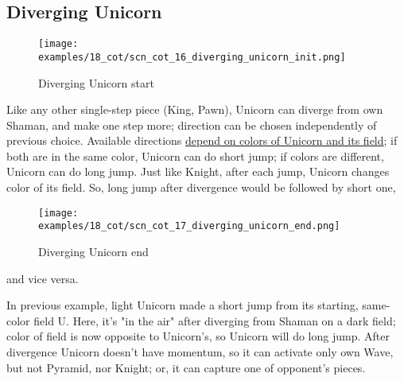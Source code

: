 \clearpage %

\subsection*{Diverging Unicorn}
\label{sec:Conquest of Tlalocan/Divergence/Diverging Unicorn}

\vspace*{-1.4\baselineskip}
\noindent
\begin{figure}[!h]
\texttt{[image: examples/18\_cot/scn\_cot\_16\_diverging\_unicorn\_init.png]}
\vspace*{-1.3\baselineskip}
\caption{Diverging Unicorn start}
\label{fig:scn_cot_16_diverging_unicorn_init}
\end{figure}

\vspace*{-0.5\baselineskip}
Like any other single-step piece (King, Pawn), Unicorn can diverge from own Shaman,
and make one step more; direction can be chosen independently of previous choice.
Available directions
\hyperref[fig:scn_aoa_01_unicorn_same_color]{depend on colors of Unicorn and its field};
if both are in the same color, Unicorn can do short jump; if colors are different, Unicorn
can do long jump. Just like Knight, after each jump, Unicorn changes color of its field.
So, long jump after divergence would be followed by short one,

\clearpage %

\vspace*{-2.1\baselineskip}
\noindent
\begin{figure}[!h]
\texttt{[image: examples/18\_cot/scn\_cot\_17\_diverging\_unicorn\_end.png]}
\vspace*{-1.3\baselineskip}
\caption{Diverging Unicorn end}
\label{fig:scn_cot_17_diverging_unicorn_end}
\end{figure}

\vspace*{-0.4\baselineskip}
\noindent
and vice versa.

In previous example, light Unicorn made a short jump from its starting, same-color
field U. Here, it's "in the air" after diverging from Shaman on a dark field; color
of field is now opposite to Unicorn's, so Unicorn will do long jump.
After divergence Unicorn doesn't have momentum, so it can activate only own Wave,
but not Pyramid, nor Knight; or, it can capture one of opponent's pieces.

